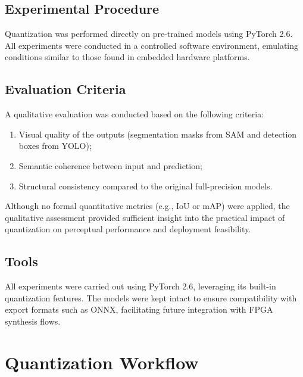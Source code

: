 \documentclass[12pt]{article}
\begin{document}
\subsection{Experimental Procedure}

Quantization was performed directly on pre-trained models using PyTorch 2.6. All experiments were conducted in a controlled software environment, emulating conditions similar to those found in embedded hardware platforms.

\subsection{Evaluation Criteria}

A qualitative evaluation was conducted based on the following criteria:

\begin{enumerate}
    \item Visual quality of the outputs (segmentation masks from SAM and detection boxes from YOLO);
    \item Semantic coherence between input and prediction;
    \item Structural consistency compared to the original full-precision models.
\end{enumerate}

Although no formal quantitative metrics (e.g., IoU or mAP) were applied, the qualitative assessment provided sufficient insight into the practical impact of quantization on perceptual performance and deployment feasibility.

\subsection{Tools}

All experiments were carried out using PyTorch 2.6, leveraging its built-in quantization features. The models were kept intact to ensure compatibility with export formats such as ONNX, facilitating future integration with FPGA synthesis flows.

\section{Quantization Workflow}
\end{document}
